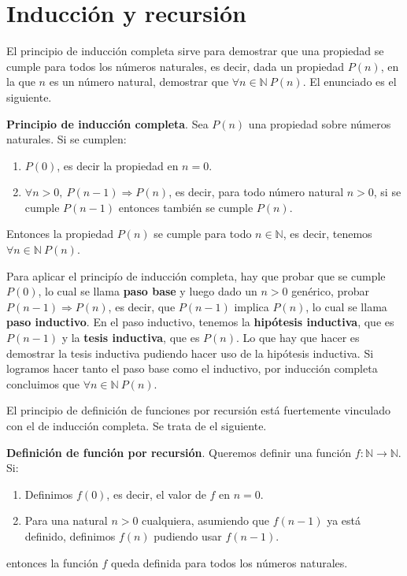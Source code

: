 \documentclass[a4paper, 12pt]{report}
\newcommand{\Ra}{\Rightarrow}
\newcommand{\N}{\mathbb{N}}
\theoremstyle{definition}
\begin{document}
\section{Inducción y recursión}\label{sec-IndyRec}

El principio de inducción completa sirve para demostrar que una propiedad se cumple para todos los números naturales, es decir, dada un propiedad $P(n)$, en la que $n$ es un número natural, demostrar que $\forall n\in\N~P(n)$. El enunciado es el siguiente.

\vspace{0.5em}
{\bf Principio de inducción completa}. Sea $P(n)$ una propiedad sobre números naturales. Si se cumplen:
\begin{enumerate}
	\item $P(0)$, es decir la propiedad en $n=0$. 
	\item $\forall n>0,~P(n-1)\Ra P(n)$, es decir, para todo número natural $n>0$, si se cumple $P(n-1)$ entonces también se cumple $P(n)$. 
\end{enumerate} 
Entonces la propiedad $P(n)$ se cumple para todo $n\in\N$, es decir, tenemos $\forall n\in\N~P(n)$.

\vspace{0.5em}
Para aplicar el principío de inducción completa, hay que probar que se cumple $P(0)$, lo cual se llama {\bf paso base} y luego dado un $n>0$ genérico, probar $P(n-1)\Ra P(n)$, es decir, que $P(n-1)$ implica $P(n)$, lo cual se llama {\bf paso inductivo}. En el paso inductivo, tenemos la {\bf hipótesis inductiva}, que es $P(n-1)$ y la {\bf tesis inductiva}, que es $P(n)$. Lo que hay que hacer es demostrar la tesis inductiva pudiendo hacer uso de la hipótesis inductiva. Si logramos hacer tanto el paso base como el inductivo, por inducción completa concluimos que $\forall n\in\N~P(n)$.

El principio de definición de funciones por recursión está fuertemente vinculado con el de inducción completa. Se trata de el siguiente.

\vspace{0.5em}
{\bf Definición de función por recursión}. Queremos definir una función $f:\N\to\N$. Si:
\begin{enumerate}
	\item Definimos $f(0)$, es decir, el valor de $f$ en $n=0$.
	\item Para una natural $n>0$ cualquiera, asumiendo que $f(n-1)$ ya está definido, definimos $f(n)$ pudiendo usar $f(n-1)$.
\end{enumerate}
entonces la función $f$ queda definida para todos los números naturales.
\end{document}
